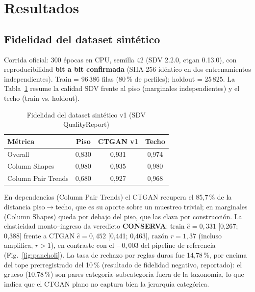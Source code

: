 \documentclass[journal]{IEEEtai}
\begin{document}
\section{Resultados}
\label{sec:resultados}
\subsection{Fidelidad del dataset sintético}
Corrida oficial: 300 épocas en CPU, semilla 42 (SDV 2.2.0, ctgan 0.13.0), con reproducibilidad \textbf{bit a bit confirmada} (SHA-256 idéntico en dos entrenamientos independientes). Train = 96\,386 filas (80\,\% de perfiles); holdout = 25\,825. La Tabla~\ref{tab:fidelidad} resume la calidad SDV frente al piso (marginales independientes) y el techo (train vs. holdout).

\begin{table}[!t]
\caption{Fidelidad del dataset sintético v1 (SDV QualityReport)}
\label{tab:fidelidad}
\centering
\begin{tabular}{lccc}
\toprule
Métrica & Piso & CTGAN v1 & Techo \\
\midrule
Overall            & 0{,}830 & 0{,}931 & 0{,}974 \\
Column Shapes      & 0{,}980 & 0{,}935 & 0{,}980 \\
Column Pair Trends & 0{,}680 & 0{,}927 & 0{,}968 \\
\bottomrule
\end{tabular}
\end{table}

En dependencias (Column Pair Trends) el CTGAN recupera el 85{,}7\,\% de la distancia piso$\rightarrow$techo, que es su aporte sobre un muestreo trivial; en marginales (Column Shapes) queda por debajo del piso, que las clava por construcción. La elasticidad monto--ingreso da veredicto \textbf{CONSERVA}: train $\hat{e}=0{,}331$ [0{,}267; 0{,}388] frente a CTGAN $\hat{e}=0{,}452$ [0{,}441; 0{,}463], razón $r=1{,}37$ (incluso amplifica, $r>1$), en contraste con el $-0{,}003$ del pipeline de referencia (Fig.~\ref{fig:pancholi}). La tasa de rechazo por reglas duras fue 14{,}78\,\%, por encima del tope prerregistrado del 10\,\% (resultado de fidelidad negativo, reportado): el grueso (10{,}78\,\%) son pares categoría--subcategoría fuera de la taxonomía, lo que indica que el CTGAN plano no captura bien la jerarquía categórica.
\end{document}
